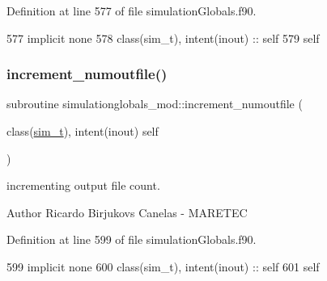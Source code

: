 Definition at line 577 of file simulation\+Globals.\+f90.


\begin{DoxyCode}
577     \textcolor{keywordtype}{implicit none}
578     \textcolor{keywordtype}{class}(sim\_t), \textcolor{keywordtype}{intent(inout)} :: self
579     self%
\end{DoxyCode}
\mbox{\label{namespacesimulationglobals__mod_a77d7175bc03e472ee9a00ee9f6ff1b0e}} 
\subsubsection{\texorpdfstring{increment\+\_\+numoutfile()}{increment\_numoutfile()}}
{\footnotesize\ttfamily subroutine simulationglobals\+\_\+mod\+::increment\+\_\+numoutfile (\begin{DoxyParamCaption}\item[{class(\mbox{\hyperlink{structsimulationglobals__mod_1_1sim__t}{sim\+\_\+t}}), intent(inout)}]{self }\end{DoxyParamCaption})\hspace{0.3cm}{\ttfamily [private]}}



incrementing output file count. 

\begin{DoxyAuthor}{Author}
Ricardo Birjukovs Canelas -\/ M\+A\+R\+E\+T\+EC 
\end{DoxyAuthor}


Definition at line 599 of file simulation\+Globals.\+f90.


\begin{DoxyCode}
599     \textcolor{keywordtype}{implicit none}
600     \textcolor{keywordtype}{class}(sim\_t), \textcolor{keywordtype}{intent(inout)} :: self
601     self%
\end{DoxyCode}
\mbox{\label{namespacesimulationglobals__mod_a3f11ed9f7735018950e1921ead871269}} 
